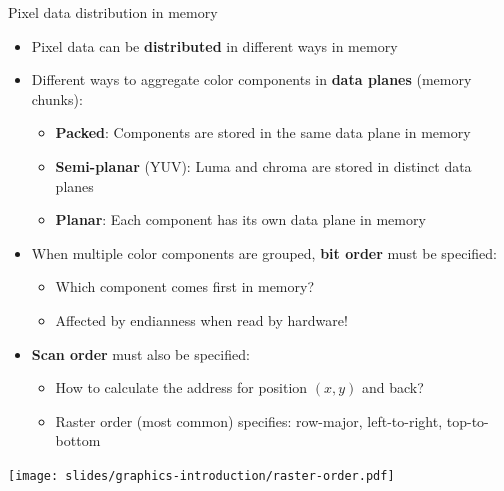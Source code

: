\begin{frame}{Pixel data distribution in memory}
  \begin{itemize}
  \item Pixel data can be \textbf{distributed} in different ways in memory
  \item Different ways to aggregate color components in \textbf{data planes} (memory chunks):
    \begin{itemize}
    \item \textbf{Packed}: Components are stored in the same data plane in memory
    \item \textbf{Semi-planar} (YUV): Luma and chroma are stored in distinct data planes
    \item \textbf{Planar}: Each component has its own data plane in memory
    \end{itemize}
  \item When multiple color components are grouped, \textbf{bit order} must be specified:
    \begin{itemize}
    \item Which component comes first in memory?
    \item Affected by endianness when read by hardware!
    \end{itemize}
  \item \textbf{Scan order} must also be specified:
    \begin{itemize}
    \item How to calculate the address for position \((x,y)\) and back?
    \item Raster order (most common) specifies: row-major, left-to-right, top-to-bottom
    \end{itemize}
  \end{itemize}
  \begin{center}
  \texttt{[image: slides/graphics-introduction/raster-order.pdf]}
  \end{center}
\end{frame}


